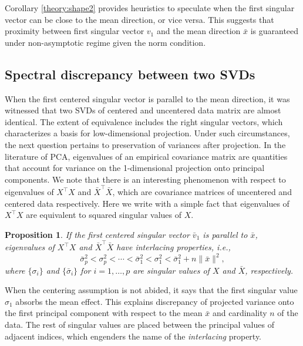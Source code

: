\documentclass[11pt]{article}
\newtheorem{proposition}[theorem]{Proposition}
\begin{document}
Corollary \ref{theory:shape2} provides heuristics to speculate when the first singular vector can be close to the mean direction, or vice versa. This suggests that proximity between first singular vector $v_1$ and the mean direction $\bar{x}$ is guaranteed under non-asymptotic regime given the norm condition.



\subsection{Spectral discrepancy between two SVDs}

When the first centered singular vector is parallel to the mean direction, it was witnessed that two SVDs of centered and uncentered data matrix are almost identical. The extent of equivalence includes the right singular vectors, which characterizes a basis for low-dimensional projection. Under such circumstances, the next question pertains to preservation of variances after projection. In the literature of PCA, eigenvalues of an empirical covariance matrix are quantities that account for variance on the 1-dimensional projection onto principal components. We note that there is an interesting phenomenon with respect to eigenvalues of $X^\top X$ and $\bar{X}^\top \bar{X}$, which are covariance matrices of uncentered and centered data respectively. Here we write with a simple fact that eigenvalues of $X^\top X$ are equivalent to squared singular values of $X$. 





\vspace{0.25cm}
\begin{tcolorbox}[colback=GreenYellow]
\begin{proposition}\label{prop:3}
	If the first centered singular vector $\bar{v}_1$ is parallel to $\bar{x}$, eigenvalues of $X^\top X$ and $\bar{X}^\top \bar{X}$ have interlacing properties, i.e., 
	\begin{equation*}
		\bar{\sigma}_p^2 < \sigma_p^2 < \cdots < \bar{\sigma}_1^2 < \sigma_1^2 < \bar{\sigma}_1^2 + n \|\bar{x}\|^2,
	\end{equation*}
	where $\lbrace\sigma_i\rbrace$ and $\lbrace \bar{\sigma}_i\rbrace$ for $i=1,\ldots,p$ are singular values of $X$ and $\bar{X}$, respectively. 
\end{proposition}
\end{tcolorbox}
\vspace{0.25cm}

When the centering assumption is not abided, it says that the first singular value $\sigma_1$ absorbs the mean effect. This explains discrepancy of projected variance onto the first principal component with respect to the mean $\bar{x}$ and cardinality $n$ of the data. The rest of singular values are placed between the principal values of adjacent indices, which engenders the name of the \textit{interlacing} property. 
\end{document}
